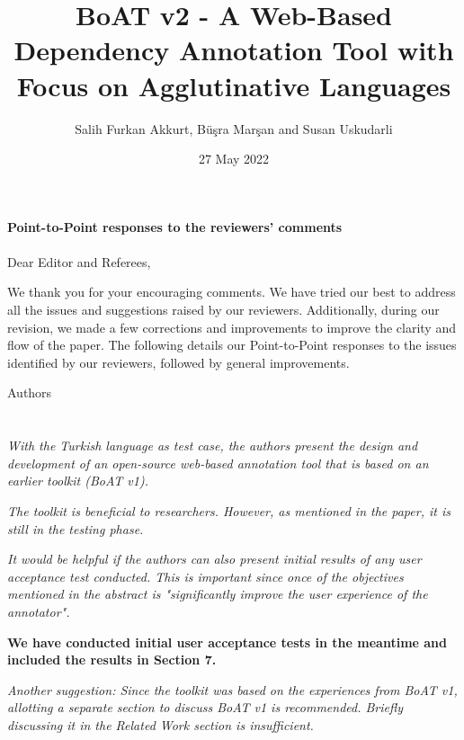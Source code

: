 \documentclass[final,2p]{article}
\newcommand{\comment}{\emph}
\newcommand{\response}{\noindent \textbf}
\begin{document}
%
\title{BoAT v2 - A Web-Based Dependency Annotation Tool with Focus on Agglutinative Languages}%
\author{Salih Furkan Akkurt, Büşra Marşan and Susan Uskudarli}
\date{27 May 2022}

\maketitle

\textbf{Point-to-Point responses to the reviewers' comments}\\\\


Dear Editor and Referees,

We thank you for your encouraging comments. 
We have tried our best to address all the issues and suggestions raised by our reviewers. 
Additionally, during our revision, we made a few corrections and improvements to improve the clarity and flow of the paper. 
The following details our Point-to-Point responses to the issues identified by our reviewers, followed by general improvements.

Authors

\section*{}

\comment{With the Turkish language as test case, the authors present the design and development of an open-source web-based annotation tool that is based on an earlier toolkit (BoAT v1).}

\comment{The toolkit is beneficial to researchers. However, as mentioned in the paper, it is still in the testing phase.}

\comment{It would be helpful if the authors can also present initial results of any user acceptance test conducted. This is important since once of the objectives mentioned in the abstract is "significantly improve the user experience of the annotator".}

\response{We have conducted initial user acceptance tests in the meantime and included the results in Section 7.}

\comment{Another suggestion: Since the toolkit was based on the experiences from BoAT v1, allotting a separate section to discuss BoAT v1 is recommended. Briefly discussing it in the Related Work section is insufficient.}
\end{document}
